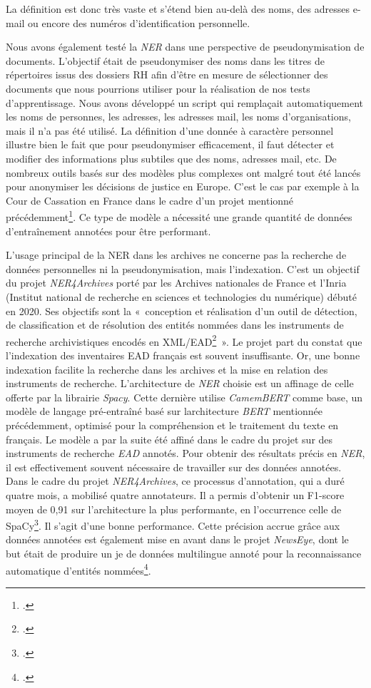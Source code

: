 La définition est donc très vaste et s'étend bien au-delà des noms, des
adresses e-mail ou encore des numéros d'identification personnelle. 

Nous
avons également testé la \emph{NER} dans une perspective de pseudonymisation de
documents. L'objectif était de pseudonymiser des noms dans les titres de
répertoires issus des dossiers RH afin d'être en mesure de sélectionner
des documents que nous pourrions utiliser pour la réalisation de nos
tests d'\gls{apprentissage}. Nous avons développé un script qui
remplaçait automatiquement les noms de personnes, les adresses, les
adresses mail, les noms d'organisations, mais il n'a pas été utilisé. La
définition d'une donnée à caractère personnel illustre bien le fait que
pour pseudonymiser efficacement, il faut détecter et modifier des informations plus subtiles que des
noms, adresses mail, etc. De nombreux outils basés sur des modèles plus complexes ont malgré tout été lancés pour
anonymiser les décisions de justice en Europe. C'est le cas par exemple
à la Cour de Cassation en France dans le cadre d'un projet mentionné
précédemment\footcite{girard-chanudet_travail_2023}.
Ce type de modèle a nécessité une grande quantité de données d'entraînement annotées pour
être performant.
\newline

L'usage principal de la \gls{NER} dans les archives ne concerne pas la
recherche de données personnelles ni la pseudonymisation, mais
l'indexation. C'est un objectif du projet \emph{NER4Archives} porté par les
Archives nationales de France et l'Inria (Institut national de recherche
en sciences et technologies du numérique) débuté en 2020. Ses objectifs
sont la «~conception et réalisation d'un outil de détection, de
classification et de résolution des entités nommées dans les instruments
de recherche archivistiques encodés en XML/EAD\footcite{clavaud_ner4archives_2022}~». 
Le projet part du constat que l'indexation des
inventaires EAD français est souvent insuffisante. Or, une bonne
indexation facilite la recherche dans les archives et la mise en
relation des instruments de recherche. L'architecture de \emph{NER} choisie est
un affinage de celle offerte par la librairie \emph{Spacy}. Cette
dernière utilise \emph{CamemBERT} comme base, un modèle de langage
pré-entraîné basé sur l\textquotesingle architecture \emph{BERT}
mentionnée précédemment, optimisé pour la compréhension et le traitement
du texte en français. Le modèle a par la suite été affiné dans le cadre
du projet sur des instruments de recherche \emph{EAD} annotés. Pour obtenir des
résultats précis en \emph{NER}, il est effectivement souvent nécessaire de
travailler sur des données annotées. Dans le cadre du projet
\emph{NER4Archives}, ce processus d'annotation, qui a duré quatre mois,
a mobilisé quatre annotateurs. Il a permis d'obtenir un \gls{F1-score} 
moyen de 0,91 sur l'architecture la plus performante, en l'occurrence
celle de SpaCy\footcite{clavaud_ner4archives_2022}. Il s'agit d'une bonne performance. Cette précision accrue
grâce aux données annotées est également mise en avant dans le projet
\emph{NewsEye}, dont le but était de produire un je de données multilingue
annoté pour la reconnaissance automatique d'entités nommées\footcite{hamdi_multilingual_2021}.

